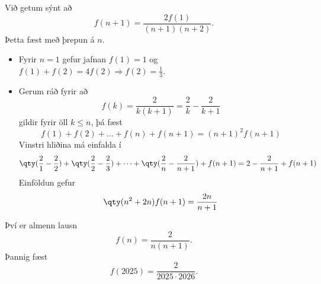Við getum sýnt að
\[
f(n+1) = \frac{2 f(1)}{(n+1)(n+2)}.
\]
Þetta fæst með þrepun á $n$.

\begin{itemize}
    \item[i)] Fyrir $n=1$ gefur jafnan $f(1)=1$ og $f(1)+f(2)=4f(2)\Rightarrow f(2)=\tfrac{1}{3}$.
    \item[ii)] Gerum ráð fyrir að 
    $$f(k)=\frac{2}{k(k+1)} = \frac{2}{k} - \frac{2}{k+1}$$ gildir fyrir öll $k\leq n$,
þá fæst
\[
f(1) + f(2) + \dots + f(n) + f(n+1) = (n+1)^2 f(n+1) 
\]
Vinstri hliðina má einfalda í 
\[
\qty(\frac{2}{1} - \frac{2}{2}) + \qty(\frac{2}{2} - \frac{2}{3}) + \dots + \qty(\frac{2}{n} - \frac{2}{n+1}) + f(n+1) = 2 - \frac{2}{n+1} + f(n+1)
\]
Einföldun gefur 
\[
\qty(n^2+2n)f(n+1) = \frac{2n}{n+1} 
\]
\end{itemize}
Því er almenn lausn
\[
f(n)=\frac{2}{n(n+1)}.
\]
Þannig fæst
\[
f(2025)=\frac{2}{2025\cdot2026}.
\]